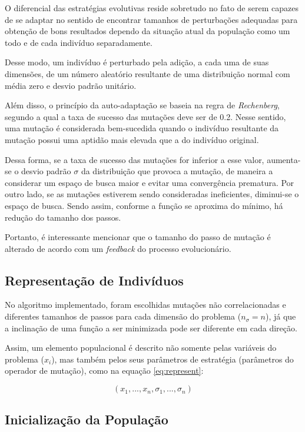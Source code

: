 \documentclass[conference,compsoc]{IEEEtran}
\begin{document}
O diferencial das estratégias evolutivas reside sobretudo no fato de serem capazes de se adaptar no sentido de encontrar tamanhos de perturbações adequadas para obtenção de bons resultados \cite{notas_aula_JG} dependo da situação atual da população como um todo e de cada indivíduo separadamente. 

Desse modo, um indivíduo é perturbado pela adição, a cada uma de suas dimensões, de um número aleatório resultante de uma distribuição normal com média zero e desvio padrão unitário.

Além disso, o princípio da auto-adaptação se baseia na regra de \textit{Rechenberg}, segundo a qual a taxa de sucesso das mutações deve ser de 0.2. Nesse sentido, uma mutação é considerada bem-sucedida quando o indivíduo resultante da mutação possui uma aptidão mais elevada que a do indivíduo original.

Dessa forma, se a taxa de sucesso das mutações for inferior a esse valor, aumenta-se o desvio padrão $\sigma$ da distribuição que provoca a mutação, de maneira a considerar um espaço de busca maior e evitar uma convergência prematura. Por outro lado, se as mutações estiverem sendo consideradas ineficientes, diminui-se o espaço de busca. Sendo assim, conforme a função se aproxima do mínimo, há redução do tamanho dos passos.

Portanto, é interessante mencionar que o tamanho do passo de mutação é alterado de acordo com um \textit{feedback} do processo evolucionário.

\subsection{Representação de Indivíduos}

No algoritmo implementado, foram escolhidas mutações não correlacionadas e diferentes tamanhos de passos para cada dimensão do problema ($n_\sigma=n$), já que a inclinação de uma função a ser minimizada pode ser diferente em cada direção.

Assim, um elemento populacional é descrito não somente pelas variáveis do problema ($x_i$), mas também pelos seus parâmetros de estratégia (parâmetros do operador de mutação), como na equação \ref{eq:represent}:

\begin{equation}
(x_1, ... , x_n,\sigma_1, ... , \sigma_n) %
\label{eq:represent}
\end{equation}


 \subsection{Inicialização da População}
 
\end{document}

